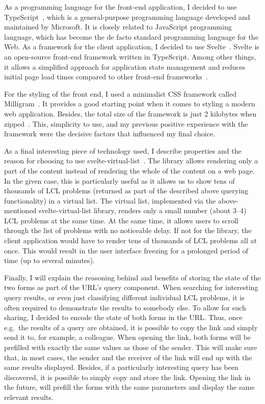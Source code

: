 As a programming language for the front-end application, I decided
to use TypeScript~\cite{TypeScript}, which is a general-purpose
programming language developed and maintained by Microsoft. It
is closely related to JavaScript programming language, which
has become the de facto standard programming language for the Web.
As a framework for the client application, I decided to use
Svelte~\cite{Svelte}. Svelte is an open-source front-end framework
written in TypeScript. Among other things, it allows a simplified
approach for application state management and reduces initial
page load times compared to other front-end frameworks~\cite{SvelteVsReactBundleSize}.

For the styling of the front end, I used a minimalist CSS framework
called Milligram~\cite{Milligram}. It provides a good starting point
when it comes to styling a modern web application. Besides, the total
size of the framework is just 2 kilobytes when zipped~\cite{Milligram}.
This, simplicity to use, and my previous positive experience with
the framework were the decisive factors that influenced my final
choice.

As a final interesting piece of technology used, I describe properties
and the reason for choosing to use svelte-virtual-list~\cite{svelte-virtual-list}.
The library allows rendering only a part of the content instead of rendering
the whole of the content on a web page. In the given case, this is
particularly useful as it allows us to
show tens of thousands of LCL problems (returned as part of the described above querying functionality) in a virtual list.
The virtual list, implemented via the above-mentioned svelte-virtual-list library, renders only a small number (about 3--4)
LCL problems at the same time. At the same time, it allows users to
scroll through the list of problems with no noticeable delay.
If not for the library, the client application would have to render
tens of thousands of LCL problems all at once. This would result in
the user interface freezing for a prolonged period of time (up to several minutes).

Finally, I will explain the reasoning behind and benefits of
storing the state of the two forms as part of the URL's query
component. When searching for interesting query results, or even
just classifying different individual LCL problems, it is often
required to demonstrate the results to somebody else. To allow for such
sharing, I decided to encode the state of both forms in the URL.
Thus, once e.g.\ the results of a query are obtained, it is possible
to copy the link and simply send it to, for example, a colleague.
When opening the link, both forms will be prefilled with
exactly the same values as those of the sender. This will make sure
that, in most cases, the sender and the receiver of the link will end
up with the same results displayed. Besides, if a particularly
interesting query has been discovered, it is possible to
simply copy and store the link. Opening the link in the future,
will prefill the forms with the same parameters and display
the same relevant results.
